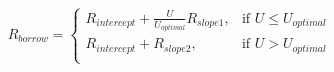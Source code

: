 \documentclass[preview]{standalone}
\begin{document}
\begin{align*}
R_{borrow} = 
                            \begin{cases} R_{intercept} + \frac{ U }{ U _{optimal}}R_{slope1}, & \text{if }  U  \leq  U _{optimal} \\[6pt] R_{intercept} + R_{slope2}, & \text{if }  U  >  U _{optimal} \\ &
                            \end{cases}
\end{align*}
\end{document}
